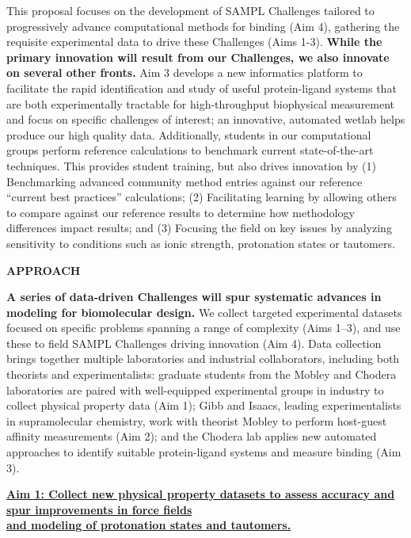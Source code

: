 \documentclass[11pt]{article}
\begin{document}
This proposal focuses on the development of SAMPL Challenges tailored to progressively advance computational methods for binding (Aim 4), gathering the requisite experimental data to drive these Challenges (Aims 1-3). 
\textbf{While the primary innovation will result from our Challenges, we also innovate on several other fronts.}
Aim 3 develops a new informatics platform to facilitate the rapid identification and study of useful protein-ligand systems that are both experimentally tractable for high-throughput biophysical measurement and focus on specific challenges of interest; an innovative, automated wetlab helps produce our high quality data. 
Additionally, students in our computational groups perform reference calculations to benchmark current state-of-the-art techniques.
This provides student training, but also drives innovation by (1) Benchmarking advanced community method entries against our reference ``current best practices'' calculations; (2) Facilitating learning by allowing others to compare against our reference results to determine how methodology differences impact results; and (3) Focusing the field on key issues by analyzing sensitivity to conditions such as ionic strength, protonation states or tautomers.

{\Large\textbf{APPROACH}}



\textbf{A series of data-driven Challenges will spur systematic advances in modeling for biomolecular design.}
We collect targeted experimental datasets focused on specific problems spanning a range of complexity (Aims 1--3), and use these to field SAMPL Challenges driving innovation (Aim 4).
Data collection brings together multiple laboratories and industrial collaborators, including both theorists and experimentalists: graduate students from the Mobley and Chodera laboratories are paired with well-equipped experimental groups in industry to collect physical property data (Aim 1); Gibb and Isaacs, leading experimentalists in supramolecular chemistry, work with theorist Mobley to perform host-guest affinity measurements (Aim 2); and the Chodera lab applies new automated approaches to identify suitable protein-ligand systems and measure binding (Aim 3).


\textbf{\underline{Aim 1: Collect new physical property datasets to assess accuracy and spur improvements in force fields}}\\
\textbf{\underline{and modeling of protonation states and tautomers.}} 
\end{document}
